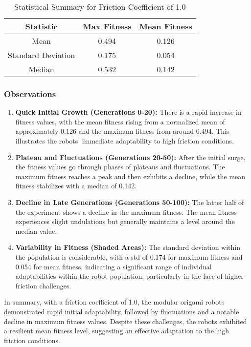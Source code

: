 \documentclass{sigchi}
\begin{document}
\begin{table}[h!]
\centering
\caption{Statistical Summary for Friction Coefficient of 1.0}
\label{tab:stats_1.0}
\begin{tabular}{ccc}
\hline
Statistic & Max Fitness & Mean Fitness \\
\hline
Mean & 0.494 & 0.126 \\
Standard Deviation & 0.175 & 0.054 \\
Median & 0.532 & 0.142 \\
\hline
\end{tabular}
\end{table}


\subsubsection{Observations}
\begin{enumerate}
    \item \textbf{Quick Initial Growth (Generations 0-20):} There is a rapid increase in fitness values, with the mean fitness rising from a normalized mean of approximately 0.126 and the maximum fitness from around 0.494. This illustrates the robots' immediate adaptability to high friction conditions.
    
    \item \textbf{Plateau and Fluctuations (Generations 20-50):} After the initial surge, the fitness values go through phases of plateaus and fluctuations. The maximum fitness reaches a peak and then exhibits a decline, while the mean fitness stabilizes with a median of 0.142.
    
    \item \textbf{Decline in Late Generations (Generations 50-100):} The latter half of the experiment shows a decline in the maximum fitness. The mean fitness experiences slight undulations but generally maintains a level around the median value.
    
    \item \textbf{Variability in Fitness (Shaded Areas):} The standard deviation within the population is considerable, with a std of 0.174 for maximum fitness and 0.054 for mean fitness, indicating a significant range of individual adaptabilities within the robot population, particularly in the face of higher friction challenges.
\end{enumerate}

In summary, with a friction coefficient of 1.0, the modular origami robots demonstrated rapid initial adaptability, followed by fluctuations and a notable decline in maximum fitness values. Despite these challenges, the robots exhibited a resilient mean fitness level, suggesting an effective adaptation to the high friction conditions.
\end{document}
